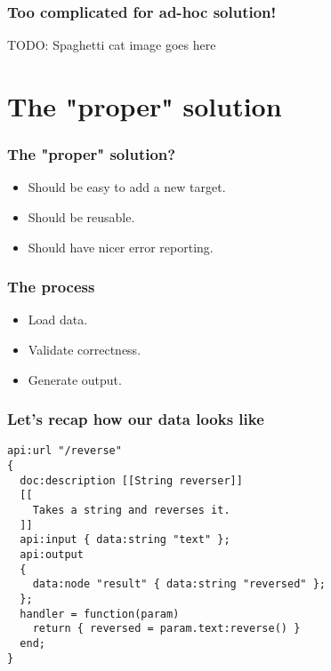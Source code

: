 \documentclass[handout]{beamer}
\begin{document}

\begin{frame}

\frametitle{Too complicated for ad-hoc solution!}

TODO: Spaghetti cat image goes here

\end{frame}


\section{The "proper" solution}


\begin{frame}

\frametitle{The "proper" solution?}

\begin{itemize}
\item Should be easy to add a new target.
\item Should be reusable.
\item Should have nicer error reporting.
\end{itemize}

\end{frame}


\begin{frame}

\frametitle{The process}

\begin{itemize}
\item Load data.
\item Validate correctness.
\item Generate output.
\end{itemize}

\end{frame}


\begin{frame}[fragile]

\frametitle{Let's recap how our data looks like}

\begin{verbatim}
api:url "/reverse"
{
  doc:description [[String reverser]]
  [[
    Takes a string and reverses it.
  ]]
  api:input { data:string "text" };
  api:output
  {
    data:node "result" { data:string "reversed" };
  };
  handler = function(param)
    return { reversed = param.text:reverse() }
  end;
}
\end{verbatim}

\end{frame}
\end{document}
